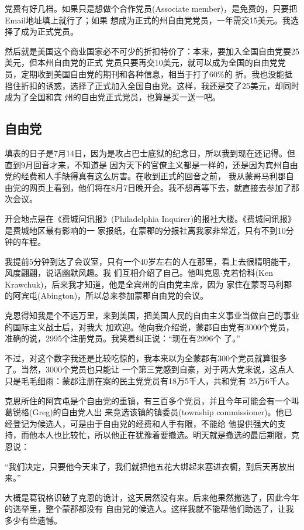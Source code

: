 ﻿\documentclass[11pt]{article}
\begin{document}
党费有好几档。如果只是想做个合作党员(Associate member)，是免费的，只要把Email地址填上就行了；如果
想成为正式的州自由党党员，一年需交15美元。我选择了成为正式党员。

然后就是美国这个商业国家必不可少的折扣特价了：本来，要加入全国自由党要25美元，但本州自由党的正式
党员只要再交10美元，就可以成为全国的自由党党员，定期收到美国自由党的期刊和各种信息，相当于打了60\%的
折。我也没能抵挡住折扣的诱惑，选择了正式加入全国自由党。这样，我还是交了25美元，却同时成为了全国和宾
州的自由党正式党员，也算是买一送一吧。

\subsection{自由党}

填表的日子是7月14日，因为是攻占巴士底狱的纪念日，所以我到现在还记得。但直到9月回音才来，不知道是
因为天下的官僚主义都是一样的，还是因为宾州自由党的经费和人手缺得真有这么厉害。在收到正式的回音之前，
我从蒙哥马利郡自由党的网页上看到，他们将在8月7日晚开会。我不想再等下去，就直接去参加了那次会议。

开会地点是在《费城问讯报》(Philadelphia Inquirer)的报社大楼。《费城问讯报》是费城地区最有影响的一
家报纸，在蒙郡的分报社离我家非常近，只有不到10分钟的车程。

我提前5分钟到达了会议室，只有一个40岁左右的人在那里，看上去很精明能干，风度翩翩，说话幽默风趣。我
们互相介绍了自己。他叫克恩$\cdot$克若恰科(Ken Krawchuk)，后来我才知道，他是全宾州的自由党主席，因为
家住在蒙哥马利郡的阿宾屯(Abington)，所以总来参加蒙郡自由党的会议。

克恩得知我是个不远万里，来到美国，把美国人民的自由主义事业当做自己的事业的国际主义战士后，对我大
加欢迎。他向我介绍说，蒙郡自由党有3000个党员，准确的说，2995个注册党员。我笑着纠正说：``现在有2996个
了。''

不过，对这个数字我还是比较吃惊的，我本来以为全蒙郡有300个党员就算很多了。当然，3000个党员也只能让
一个第三党感到自豪，对于两大党来说，这点人只是毛毛细雨：蒙郡注册在案的民主党党员有18万5千人，共和党有
25万6千人。

克恩所住的阿宾屯是个自由党的重镇，有三百多个党员，并且今年可能会有一个叫葛锐格(Greg)的自由党人出
来竞选该镇的镇委员(township commissioner)。他已经登记为候选人，可是由于自由党的经费和人手有限，不能给
他提供强大的支持，而他本人也比较忙，所以他正在犹豫着要撤选。明天就是撤选的最后期限，克恩说：

``我们决定，只要他今天来了，我们就把他五花大绑起来塞进衣橱，到后天再放出来。''

大概是葛锐格识破了克恩的诡计，这天居然没有来。后来他果然撤选了，因此今年的选举里，整个蒙郡都没有
自由党的候选人。这样我就不能帮他们助选了，让我多少有些遗憾。
\end{document}
